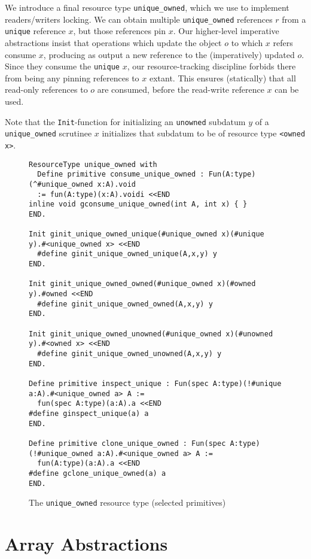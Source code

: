 \documentclass[9pt,natbib]{sigplanconf}
\begin{document}
We introduce a final resource type \texttt{unique\_owned}, which we
use to implement readers/writers locking.  We can obtain multiple
\texttt{unique\_owned} references $r$ from a \texttt{unique} reference
$x$, but those references pin $x$.  Our higher-level imperative
abstractions insist that operations which update the object $o$ to
which $x$ refers consume $x$, producing as output a new reference to
the (imperatively) updated $o$.  Since they consume the
\texttt{unique} $x$, our resource-tracking discipline forbids there
from being any pinning references to $x$ extant.  This ensures
(statically) that all read-only references to $o$ are consumed, before
the read-write reference $x$ can be used.  

Note that the \texttt{Init}-function for initializing an
\texttt{unowned} subdatum $y$ of a \texttt{unique\_owned} scrutinee
$x$ initializes that subdatum to be of resource type \texttt{<owned
  x>}.

\begin{figure*}
\small
\begin{verbatim}
ResourceType unique_owned with
  Define primitive consume_unique_owned : Fun(A:type)(^#unique_owned x:A).void
  := fun(A:type)(x:A).voidi <<END
inline void gconsume_unique_owned(int A, int x) { }
END.

Init ginit_unique_owned_unique(#unique_owned x)(#unique y).#<unique_owned x> <<END
  #define ginit_unique_owned_unique(A,x,y) y
END.

Init ginit_unique_owned_owned(#unique_owned x)(#owned y).#owned <<END
  #define ginit_unique_owned_owned(A,x,y) y
END.

Init ginit_unique_owned_unowned(#unique_owned x)(#unowned y).#<owned x> <<END
  #define ginit_unique_owned_unowned(A,x,y) y
END.

Define primitive inspect_unique : Fun(spec A:type)(!#unique a:A).#<unique_owned a> A :=
  fun(spec A:type)(a:A).a <<END
#define ginspect_unique(a) a
END.

Define primitive clone_unique_owned : Fun(spec A:type)(!#unique_owned a:A).#<unique_owned a> A :=
  fun(A:type)(a:A).a <<END
#define gclone_unique_owned(a) a
END.
\end{verbatim}
\caption{The \texttt{unique\_owned} resource type (selected primitives)}
\label{fig:uniqueowned}
\end{figure*}

\section{Array Abstractions}
\end{document}
